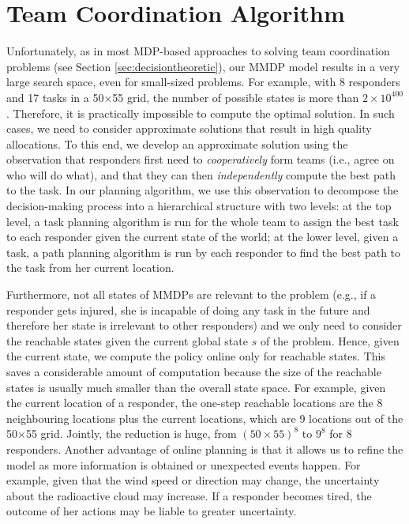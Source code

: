 \section{Team Coordination Algorithm}\label{sec:algo}
\noindent Unfortunately, as in most MDP-based approaches to solving team coordination problems (see Section \ref{sec:decisiontheoretic}), our  MMDP model results in a very large search space,
even for small-sized problems. For example, with 8 responders and
17 tasks in a 50$\times$55 grid, the number of possible states is
more than $2\times 10^{400}$. Therefore, it is practically
impossible to compute the optimal solution. In such cases, we need
to consider approximate solutions that result in high quality
allocations.  To this end, we develop an
approximate solution using  the observation that responders first need to {\em cooperatively}  form teams (i.e., agree on who will do what),
and  that they can then {\em independently} compute the best path to the task.
In our planning algorithm, we use this observation to decompose the
decision-making process into a hierarchical structure with two
levels: at the top level, a task planning algorithm is run for the
whole team to assign the best task to each responder given the
current state of the world; at the lower level, given a task, a
path planning algorithm is run by each responder to find the best
path to the task from her current location.

Furthermore, not all states of MMDPs are relevant to the problem
(e.g., if a responder gets injured, she is incapable of doing any
task in the future and therefore her state is irrelevant
to other responders) and we only need to consider the reachable
states given the current global state $s$ of the problem. Hence,
given the current state, we compute the policy online only for
reachable states. This saves a considerable amount of computation
because the size of the reachable states is usually much smaller
than the overall state space. For example, given the current
location of a responder, the one-step reachable locations are the 8
neighbouring locations plus the current locations, which are 9
locations out of the 50$\times$55 grid. Jointly, the reduction is
huge, from $(50\times 55)^8$ to $9^8$ for 8 responders. Another
advantage of online planning is that it allows us to refine the
model as more information is obtained or unexpected events happen.
For example, given that the wind speed or  direction 
 may change, the uncertainty about the radioactive cloud may increase.
If a responder becomes tired, the outcome of  her actions may
be liable to greater uncertainty.

